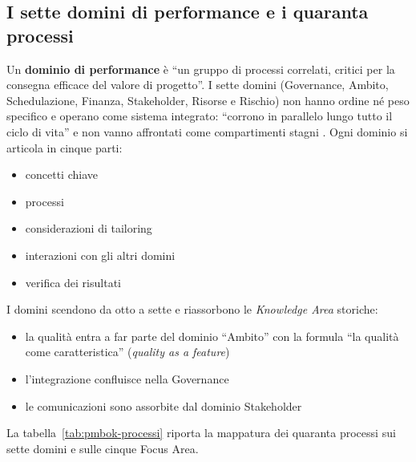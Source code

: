 \subsection{I sette domini di performance e i quaranta processi}

Un \textbf{dominio di performance} \`e ``un gruppo di processi correlati,
critici per la consegna efficace del valore di progetto''. I sette domini
(Governance, Ambito, Schedulazione, Finanza, Stakeholder, Risorse e Rischio) 
non hanno ordine n\'e peso specifico e operano come sistema integrato:
``corrono in parallelo lungo tutto il ciclo di vita'' e non vanno affrontati
come compartimenti stagni \cite{pmbok8}. Ogni dominio si articola in cinque
parti:
\begin {itemize}
\item concetti chiave
\item processi
\item considerazioni di tailoring
\item interazioni con gli altri domini
\item verifica dei risultati
\end {itemize}

I domini scendono da otto a sette e riassorbono le \emph{Knowledge Area}
storiche:
\begin {itemize}
\item la qualit\`a entra a far parte del dominio
``Ambito'' con la formula ``la qualit\`a come caratteristica'' (\emph{quality as a
feature})
\item l'integrazione confluisce nella Governance
\item le comunicazioni sono assorbite dal dominio Stakeholder
\end {itemize}
La tabella~\ref{tab:pmbok-processi} riporta la mappatura dei quaranta processi
sui sette domini e sulle cinque Focus Area.

